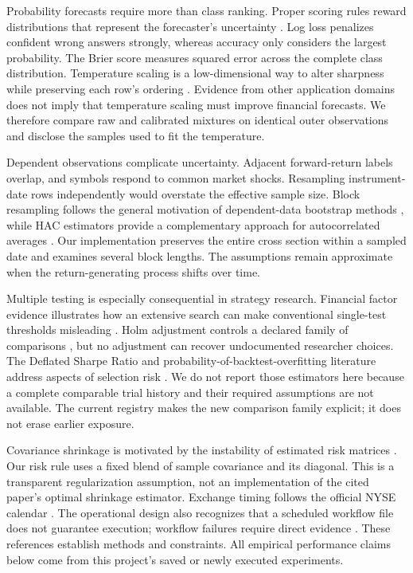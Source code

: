 \documentclass[11pt,a4paper]{article}
\begin{document}
Probability forecasts require more than class ranking. Proper scoring rules reward distributions that represent the forecaster's uncertainty \citep{gneiting2007}. Log loss penalizes confident wrong answers strongly, whereas accuracy only considers the largest probability. The Brier score measures squared error across the complete class distribution. Temperature scaling is a low-dimensional way to alter sharpness while preserving each row's ordering \citep{guo2017}. Evidence from other application domains does not imply that temperature scaling must improve financial forecasts. We therefore compare raw and calibrated mixtures on identical outer observations and disclose the samples used to fit the temperature.

Dependent observations complicate uncertainty. Adjacent forward-return labels overlap, and symbols respond to common market shocks. Resampling instrument-date rows independently would overstate the effective sample size. Block resampling follows the general motivation of dependent-data bootstrap methods \citep{kunsch1989}, while HAC estimators provide a complementary approach for autocorrelated averages \citep{newey1987}. Our implementation preserves the entire cross section within a sampled date and examines several block lengths. The assumptions remain approximate when the return-generating process shifts over time.

Multiple testing is especially consequential in strategy research. Financial factor evidence illustrates how an extensive search can make conventional single-test thresholds misleading \citep{harvey2016}. Holm adjustment controls a declared family of comparisons \citep{holm1979}, but no adjustment can recover undocumented researcher choices. The Deflated Sharpe Ratio and probability-of-backtest-overfitting literature address aspects of selection risk \citep{bailey2014,bailey2015}. We do not report those estimators here because a complete comparable trial history and their required assumptions are not available. The current registry makes the new comparison family explicit; it does not erase earlier exposure.

Covariance shrinkage is motivated by the instability of estimated risk matrices \citep{ledoit2004}. Our risk rule uses a fixed blend of sample covariance and its diagonal. This is a transparent regularization assumption, not an implementation of the cited paper's optimal shrinkage estimator. Exchange timing follows the official NYSE calendar \citep{nyse2026}. The operational design also recognizes that a scheduled workflow file does not guarantee execution; workflow failures require direct evidence \citep{github2026}. These references establish methods and constraints. All empirical performance claims below come from this project's saved or newly executed experiments.
\end{document}
